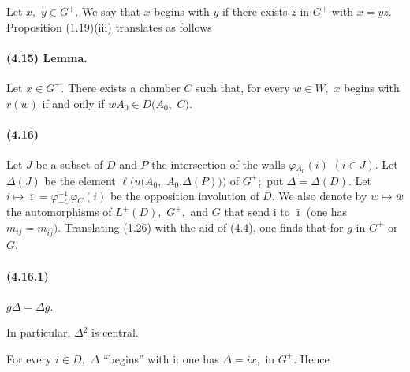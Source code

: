 \documentclass[10pt,a4paper]{article}
\begin{document}
Let \ensuremath{x,} \ensuremath{y\in{}G^{+}.} We say that \ensuremath{x} begins with \ensuremath{y} if there exists \ensuremath{z} in \ensuremath{G^{+}} with \ensuremath{x=yz.} Proposition (1.19)(iii) translates as follows\par

\paragraph{(4.15) Lemma.} Let \ensuremath{x\in{}G^{+}.} There exists a chamber \ensuremath{C} such that, for every \ensuremath{w\in{}W,} \ensuremath{x} begins with \ensuremath{r(w)} if and only if \ensuremath{wA_0\in{}D(A_0,} \ensuremath{C).}


\paragraph{(4.16)} Let \ensuremath{J} be a subset of \ensuremath{D} and \ensuremath{P} the intersection of the walls \ensuremath{\varphi{}_{A_0}(i)} \ensuremath{(i\in{}J).} Let \ensuremath{\Delta{}(J)} be the element \ensuremath{\ell{}(u(A_0,} \ensuremath{A_0.\Delta{}(P)))} of \ensuremath{G^{+};} put \ensuremath{\Delta{}=\Delta{}(D).} Let \ensuremath{i\longmapsto{}\bar{\imath}=\varphi{}_{-C}^{-1}\varphi{}_C(i)} be the opposition involution of \ensuremath{D.} We also denote by \ensuremath{w\longmapsto{}\overline{w}} the automorphisms of \ensuremath{L^{+}(D),} \ensuremath{G^{+},} and \ensuremath{G} that send i to \ensuremath{\bar{\imath}} (one has \ensuremath{m_{ij}=m_{\overline{i}\overline{j}}).} Translating (1.26) with the aid of (4.4), one finds that for \ensuremath{g} in \ensuremath{G^{+}} or \ensuremath{G,}

\paragraph{(4.16.1)} \ensuremath{g\Delta{}=\Delta{}\overline{g}.}

In particular, \ensuremath{\Delta{}^{2}} is central.\par

For every \ensuremath{i\in{}D,} \ensuremath{\Delta{}} ``begins'' with i: one has \ensuremath{\Delta{}=ix,} in \ensuremath{G^{+}.} Hence\par
\end{document}
